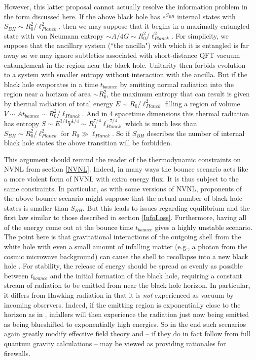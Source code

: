 \documentclass[10pt]{article}
\begin{document}
However, this latter proposal cannot actually resolve the information problem in the form discussed here.  If the above black hole has $e^{S_{BH}}$ internal states with $S_{BH} \sim R_0^2/\ell_{Planck}^2$, then we may suppose that it begins in a maximally-entangled state with von Neumann entropy $\sim A/4G \sim R_0^2/\ell_{Planck}^2$.  For simplicity, we suppose that the ancillary system (``the ancilla") with which it is entangled is far away so we may ignore subtleties associated with short-distance QFT vacuum entanglement in the region near the black hole.  Unitarity then forbids evolution to a system with smaller entropy without interaction with the ancilla.  But if the black hole evaporates in a time $t_{bounce}$ by emitting normal radiation into the region near a horizon of area $\sim R_0^2$, the maximum entropy that can result is given by thermal radiation of total energy $E \sim R_0/\ell_{Planck}^2$ filling a region of volume $V \sim A t_{bounce} \sim R_0^2/\ell_{Planck}$.  And in 4 spacetime dimensions this thermal radiation has entropy $S \sim E^{3/4} V^{1/4} \sim R_0^{7/4} \ell_{Planck}^{-7/4}$ which is much less than $S_{BH} \sim R_0^2/\ell_{Planck}^2$ for $R_0 \gg \ell_{Planck}$. So if $S_{BH}$ describes the number of internal black hole states the above transition will be forbidden.

This argument should remind the reader of the thermodynamic constraints on NVNL from section \ref{NVNL}.  Indeed, in many ways the bounce scenario acts like a more violent form of NVNL with extra energy flux.  It is thus subject to the same constraints.  In particular, as with some versions of NVNL, proponents of the above bounce scenario might suppose that the actual number of black hole states is smaller than $S_{BH}$.  But this leads to issues regarding equilibrium and the first law similar to those described in section \ref{InfoLoss}. Furthermore, having all of the energy come out at the bounce time $t_{bounce}$ gives a highly unstable scenario.  The point here is that  gravitational interactions of the outgoing shell from the white hole with even a small amount of infalling matter (e.g., a photon from the cosmic microwave background) can cause the shell to recollapse into a new black hole \cite{PhysRevLett.33.442,Barcelo:2015uff}.  For stability, the release of energy should be spread as evenly as possible between $t_{bounce}$ and the initial formation of the black hole, requiring a constant stream of radiation to be emitted from near the black hole horizon. In particular, it differs from Hawking radiation in that it is {\it not} experienced as vacuum by incoming observers.  Indeed, if the emitting region is exponentially close to the horizon as in \cite{Christodoulou:2016vny},  infallers will then experience the radiation just now being emitted as being blueshifted to exponentially high energies.  So in the end such scenarios again greatly modify effective field theory and -- if they do in fact follow from full quantum gravity calculations -- may be viewed as providing rationales for firewalls.
\end{document}
